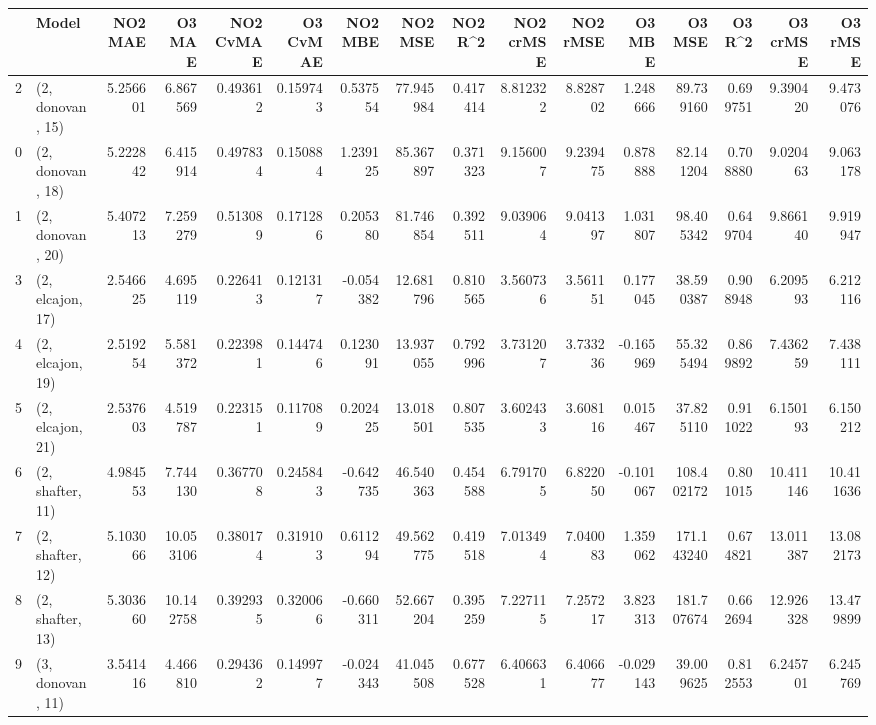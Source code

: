 \begin{tabular}{llrrrrrrrrrrrrrr}
\toprule
{} &             Model &   NO2 MAE &     O3 MAE &  NO2 CvMAE &  O3 CvMAE &   NO2 MBE &    NO2 MSE &   NO2 R\textasciicircum2 &  NO2 crMSE &  NO2 rMSE &    O3 MBE &      O3 MSE &    O3 R\textasciicircum2 &   O3 crMSE &    O3 rMSE \\
\midrule
2  &  (2, donovan, 15) &  5.256601 &   6.867569 &   0.493612 &  0.159743 &  0.537554 &  77.945984 &  0.417414 &   8.812322 &  8.828702 &  1.248666 &   89.739160 &  0.699751 &   9.390420 &   9.473076 \\
0  &  (2, donovan, 18) &  5.222842 &   6.415914 &   0.497834 &  0.150884 &  1.239125 &  85.367897 &  0.371323 &   9.156007 &  9.239475 &  0.878888 &   82.141204 &  0.708880 &   9.020463 &   9.063178 \\
1  &  (2, donovan, 20) &  5.407213 &   7.259279 &   0.513089 &  0.171286 &  0.205380 &  81.746854 &  0.392511 &   9.039064 &  9.041397 &  1.031807 &   98.405342 &  0.649704 &   9.866140 &   9.919947 \\
3  &  (2, elcajon, 17) &  2.546625 &   4.695119 &   0.226413 &  0.121317 & -0.054382 &  12.681796 &  0.810565 &   3.560736 &  3.561151 &  0.177045 &   38.590387 &  0.908948 &   6.209593 &   6.212116 \\
4  &  (2, elcajon, 19) &  2.519254 &   5.581372 &   0.223981 &  0.144746 &  0.123091 &  13.937055 &  0.792996 &   3.731207 &  3.733236 & -0.165969 &   55.325494 &  0.869892 &   7.436259 &   7.438111 \\
5  &  (2, elcajon, 21) &  2.537603 &   4.519787 &   0.223151 &  0.117089 &  0.202425 &  13.018501 &  0.807535 &   3.602433 &  3.608116 &  0.015467 &   37.825110 &  0.911022 &   6.150193 &   6.150212 \\
6  &  (2, shafter, 11) &  4.984553 &   7.744130 &   0.367708 &  0.245843 & -0.642735 &  46.540363 &  0.454588 &   6.791705 &  6.822050 & -0.101067 &  108.402172 &  0.801015 &  10.411146 &  10.411636 \\
7  &  (2, shafter, 12) &  5.103066 &  10.053106 &   0.380174 &  0.319103 &  0.611294 &  49.562775 &  0.419518 &   7.013494 &  7.040083 &  1.359062 &  171.143240 &  0.674821 &  13.011387 &  13.082173 \\
8  &  (2, shafter, 13) &  5.303660 &  10.142758 &   0.392935 &  0.320066 & -0.660311 &  52.667204 &  0.395259 &   7.227115 &  7.257217 &  3.823313 &  181.707674 &  0.662694 &  12.926328 &  13.479899 \\
9  &  (3, donovan, 11) &  3.541416 &   4.466810 &   0.294362 &  0.149977 & -0.024343 &  41.045508 &  0.677528 &   6.406631 &  6.406677 & -0.029143 &   39.009625 &  0.812553 &   6.245701 &   6.245769 \\

\end{tabular}
